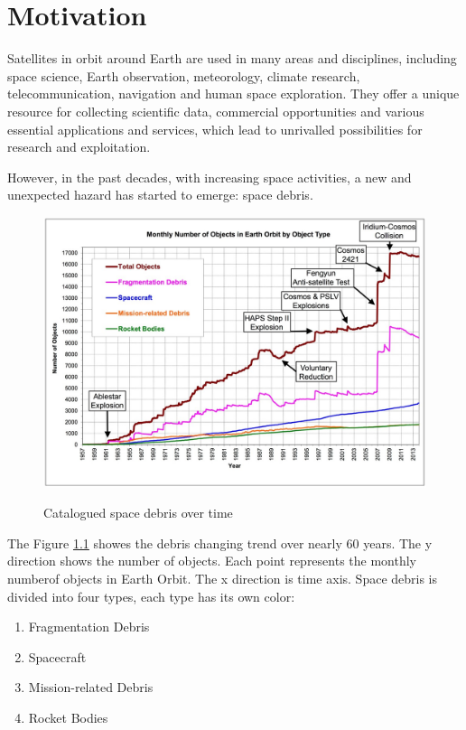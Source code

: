 \chapter{Motivation}\label{sec-motivation}

Satellites in orbit around Earth are used in many areas and disciplines, including space science, Earth observation, meteorology, climate research, telecommunication, navigation and human space exploration. They offer a unique resource for collecting scientific data, commercial opportunities and various essential applications and services, which lead to unrivalled possibilities for research and exploitation.

However, in the past decades, with increasing space activities, a new and unexpected hazard has started to emerge: space debris.

\begin{figure}[ht]
\centering
\includegraphics[width=1\textwidth]{fig/motivation/CataloguedSpaceDebrisOverTime}
\caption{Catalogued space debris over time}\cite{wright2010current}
\label{moti-CataloguedSpaceDebrisOverTime}
\end{figure}

The Figure \ref{moti-CataloguedSpaceDebrisOverTime} showes the debris changing trend over nearly 60 years. The y direction shows the number of objects. Each point represents the monthly numberof objects in Earth Orbit. The x direction is time axis. Space debris is divided into four types, each type has its own color: 
\begin{enumerate}
\item{Fragmentation Debris}
\item{Spacecraft}
\item{Mission-related Debris}
\item{Rocket Bodies}
\end{enumerate}


